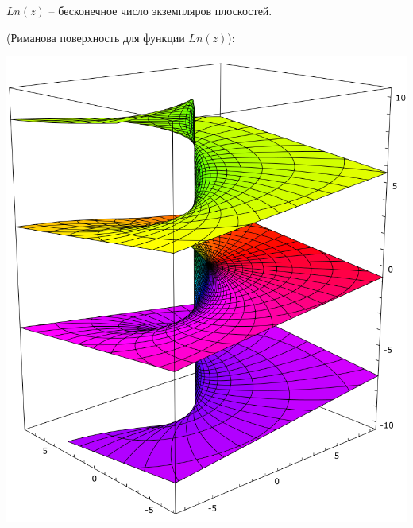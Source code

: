 \documentclass[a4paper, 12pt]{report}
\begin{document}
$Ln(z)$ -- бесконечное число экземпляров плоскостей.\par
(Риманова поверхность для функции  $Ln(z)$):

\includegraphics[width=9 cm]{Riemann/Riemann_surface_log.svg.png}
\end{document}
